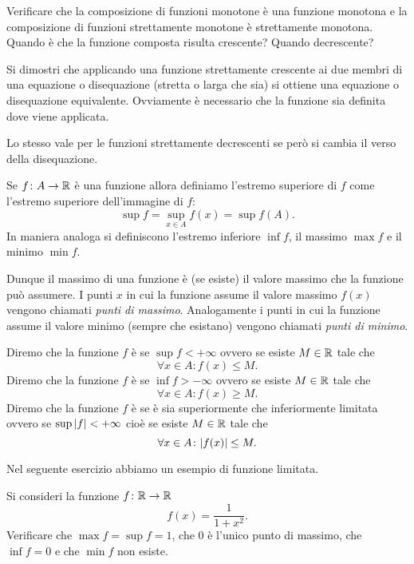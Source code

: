 \begin{exercise}
Verificare che la composizione di funzioni monotone è una
funzione monotona e la composizione di funzioni strettamente
monotone è strettamente monotona.
Quando è che la funzione composta risulta crescente?
Quando decrescente?
\end{exercise}

\begin{exercise}
Si dimostri che applicando una funzione strettamente crescente ai due
membri di una equazione o disequazione (stretta o larga che sia)
si ottiene una equazione o disequazione equivalente.
Ovviamente è necessario che la funzione sia definita dove viene applicata.

Lo stesso vale per le funzioni strettamente decrescenti se però si cambia il verso della disequazione.
\end{exercise}

\begin{definition}
\label{def:funzione_limitata}%
Se $f\colon A \to \mathbb R$ è una funzione allora definiamo
l'estremo superiore di $f$ come l'estremo superiore
dell'immagine di $f$:
\[
  \sup f = \sup_{x\in A} f(x) = \sup f(A).
\]
In maniera analoga si definiscono l'estremo inferiore $\inf f$,
il massimo $\max f$ e il minimo $\min f$.

Dunque il massimo di una funzione è (se esiste) il valore massimo
che la funzione può assumere. I punti $x$ in cui
la funzione assume il valore massimo $f(x)$ vengono chiamati
\emph{punti di massimo}.
%
%
%
Analogamente i punti in cui la funzione
assume il valore minimo (sempre che esistano) vengono
chiamati \emph{punti di minimo}.

Diremo che la funzione $f$ è
se $\sup f<+\infty$
ovvero se esiste $M\in \mathbb R$ tale che
\[
\forall x\in A \colon f(x) \le M.
\]
Diremo che la funzione $f$ è
se $\inf f > -\infty$ ovvero se esiste $M\in \mathbb R$ tale che
\[
 \forall x \in A \colon f(x) \ge M.
\]
Diremo che la funzione $f$ è 
se è sia superiormente che inferiormente limitata ovvero
se $\sup{\left|f\right|}<+\infty$ cioè se esiste $M\in \mathbb R$ tale che
\[
\forall x \in A \colon {\left|f(x)\right|}\le M.
\]
\end{definition}

Nel seguente esercizio abbiamo un esempio di funzione limitata.
\begin{exercise}
Si consideri la funzione $f\colon \mathbb R\to\mathbb R$
\[
 f(x) = \frac{1}{1+x^2}.
\]
Verificare che $\max f = \sup f = 1$, che $0$ è l'unico punto di massimo,
che $\inf f = 0$ e che $\min f$ non esiste.
\end{exercise}

